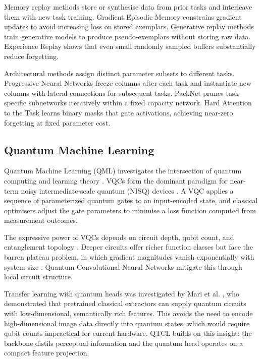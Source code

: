 \documentclass[acmlarge]{acmart}
\begin{document}
Memory replay methods store or synthesise data from prior tasks and interleave them with new task training.
Gradient Episodic Memory \cite{LopezPaz2017} constrains gradient updates to avoid increasing loss on stored exemplars.
Generative replay methods \cite{Shin2017} train generative models to produce pseudo-exemplars without storing raw data.
Experience Replay \cite{Rolnick2018} shows that even small randomly sampled buffers substantially reduce forgetting.

Architectural methods assign distinct parameter subsets to different tasks.
Progressive Neural Networks \cite{Rusu2016} freeze columns after each task and instantiate new columns with lateral connections for subsequent tasks.
PackNet \cite{Mallya2018a} prunes task-specific subnetworks iteratively within a fixed capacity network.
Hard Attention to the Task \cite{Serra2018} learns binary masks that gate activations, achieving near-zero forgetting at fixed parameter cost.

\subsection{Quantum Machine Learning}

Quantum Machine Learning (QML) investigates the intersection of quantum computing and learning theory \cite{Biamonte2017}.
VQCs form the dominant paradigm for near-term noisy intermediate-scale quantum (NISQ) devices \cite{Preskill2018,Cerezo2021}.
A VQC applies a sequence of parameterized quantum gates to an input-encoded state, and classical optimisers adjust the gate parameters to minimise a loss function computed from measurement outcomes.

The expressive power of VQCs depends on circuit depth, qubit count, and entanglement topology \cite{Du2020,Abbas2021}.
Deeper circuits offer richer function classes but face the barren plateau problem, in which gradient magnitudes vanish exponentially with system size \cite{McClean2018}.
Quantum Convolutional Neural Networks \cite{Cong2019,Pesah2021} mitigate this through local circuit structure.

Transfer learning with quantum heads was investigated by Mari et al. \cite{Mari2020}, who demonstrated that pretrained classical extractors can supply quantum circuits with low-dimensional, semantically rich features.
This avoids the need to encode high-dimensional image data directly into quantum states, which would require qubit counts impractical for current hardware.
QTCL builds on this insight: the backbone distils perceptual information and the quantum head operates on a compact feature projection.
\end{document}

